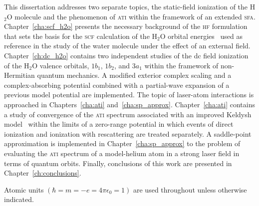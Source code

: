 This dissertation addresses two separate topics, the static-field
ionization of the H$_{2}$O molecule and the phenomenon of \textsc{ati}
within the framework of an extended
\textsc{sfa}. Chapter~\ref{cha:scf_h2o} presents the necessary
background of the \textsc{hf} formulation that sets the basis for the
\textsc{scf} calculation of the H$_{2}$O orbital
energies~\cite{Moccia_1964} used as reference in the study of the
water molecule under the effect of an external
field. Chapter~\ref{ch:dc_h2o} contains two independent studies of the
dc field ionization of the H$_{2}$O valence orbitals, $1b_{1}$,
$1b_{2}$, and $3a_{1}$ within the framework of non-Hermitian quantum
mechanics. A modified exterior complex scaling and a complex-absorbing
potential combined with a partial-wave expansion of a previous model
potential are implemented. The topic of laser-atom interactions is
approached in Chapters~\ref{cha:ati}
and~\ref{cha:sp_approx}. Chapter~\ref{cha:ati} contains a study of
convergence of the \textsc{ati} spectrum associated with an improved
Keldysh model~\cite{Kopold_1997sfa} within the limits of a zero-range
potential in which events of direct ionization and ionization with
rescattering are treated separately. A saddle-point approximation is
implemented in Chapter~\ref{cha:sp_approx} to the problem of
evaluating the \textsc{ati} spectrum of a model-helium atom in a
strong laser field in terms of quantum orbits. Finally, conclusions of
this work are presented in Chapter~\ref{ch:conclusions}.

Atomic units $(\hbar = m = -e = 4\pi\epsilon_{0} = 1)$ are used
throughout unless otherwise indicated.
































